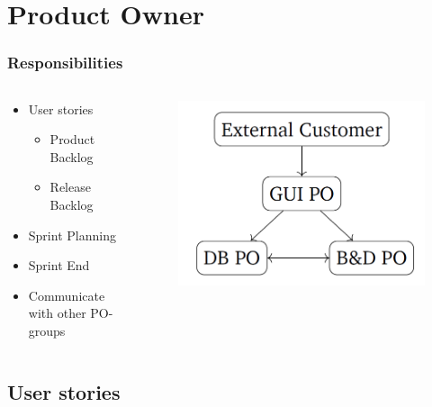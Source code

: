 \section{Product Owner}

\begin{frame}
	\begin{center}
		\frametitle{Responsibilities}
		\begin{columns}[T] %
			\begin{column}{.48\textwidth}
				\begin{itemize}
					\item User stories
						\begin{itemize}
							\item Product Backlog
							\item Release Backlog
						\end{itemize}
					\item Sprint Planning
					\item Sprint End
					\item Communicate with other PO-groups
				\end{itemize}
			\end{column}%
			\hfill%
			\begin{column}{.48\textwidth}
				\begin{figure}[H]
					\centering
					\includegraphics[width= 0.8 \textwidth]{pictures/ProductOwnerRelation.png}
				\end{figure}
			\end{column}%
		\end{columns}
	\end{center}
\end{frame}

\subsection{User stories}

